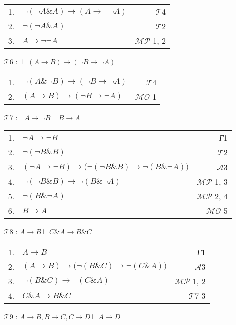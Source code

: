 \documentclass{article}
\begin{document}
\begin{itemize}
\begin{tabular}{llr}
1. & $\neg\left(\neg A\& A\right)\rightarrow\left(A\rightarrow\neg\neg A\right)$ & $\mathcal{T}$4\\
2. & $\neg\left(\neg A\& A\right)$ & $\mathcal{T}$2\\
3. & $A\rightarrow\neg\neg A$ & $\mathcal{MP}$ 1, 2
\end{tabular}
\item[$\mathcal{T}$6]: $\vdash\left(A\rightarrow B\right)\rightarrow\left(\neg B\rightarrow\neg A\right)$

\begin{tabular}{llr}
1. & $\neg\left(A\&\neg B\right)\rightarrow\left(\neg B\rightarrow\neg A\right)$ & $\mathcal{T}$4\\
2. & $\left(A\rightarrow B\right)\rightarrow\left(\neg B\rightarrow\neg A\right)$ &$\mathcal{MO}$ 1
\end{tabular}
\item[$\mathcal{T}$7]: $\neg A\rightarrow\neg B\vdash B\rightarrow A$

\begin{tabular}{llr}
1. & $\neg A\rightarrow \neg B$ & \textit{Г}1\\
2. & $\neg\left(\neg B\& B\right)$ & $\mathcal{T}$2\\
3. & $\left(\neg A\rightarrow\neg B\right)\rightarrow\bigl(\neg\left(\neg B\& B\right)\rightarrow\neg\left(B\&\neg A\right)\bigr)$ & $\mathcal{A}$3\\
4. & $\neg\left(\neg B\& B\right)\rightarrow\neg\left(B\&\neg A\right)$ & $\mathcal{MP}$ 1, 3\\
5. & $\neg\left(B\&\neg A\right)$ & $\mathcal{MP}$ 2, 4\\
6. & $B\rightarrow A$ &$\mathcal{MO}$ 5
\end{tabular}
\item[$\mathcal{T}$8]: $A\rightarrow B\vdash C\& A\rightarrow B\& C$

\begin{tabular}{llr}
1. & $A\rightarrow B$ & \textit{Г}1\\
2. & $\left(A\rightarrow B\right)\rightarrow\bigl(\neg\left(B\& C\right)\rightarrow\neg\left(C\& A\right)\bigr)$ & $\mathcal{A}$3\\
3. & $\neg\left(B\& C\right)\rightarrow\neg\left(C\& A\right)$ & $\mathcal{MP}$ 1, 2\\
4. & $C\& A\rightarrow B\& C$ & $\mathcal{T}$7 3
\end{tabular}
\item[$\mathcal{T}$9]: $A\rightarrow B, B\rightarrow C, C\rightarrow D\vdash A\rightarrow D$


\end{itemize}
\end{document}
